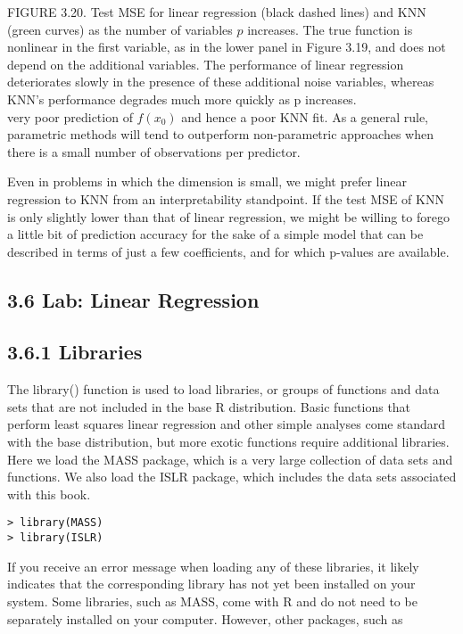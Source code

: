\documentclass[10pt]{article}
\begin{document}
FIGURE 3.20. Test MSE for linear regression (black dashed lines) and KNN (green curves) as the number of variables $p$ increases. The true function is nonlinear in the first variable, as in the lower panel in Figure 3.19, and does not depend on the additional variables. The performance of linear regression deteriorates slowly in the presence of these additional noise variables, whereas KNN's performance degrades much more quickly as p increases.\\
very poor prediction of $f\left(x_{0}\right)$ and hence a poor KNN fit. As a general rule, parametric methods will tend to outperform non-parametric approaches when there is a small number of observations per predictor.

Even in problems in which the dimension is small, we might prefer linear regression to KNN from an interpretability standpoint. If the test MSE of KNN is only slightly lower than that of linear regression, we might be willing to forego a little bit of prediction accuracy for the sake of a simple model that can be described in terms of just a few coefficients, and for which p-values are available.

\subsection*{3.6 Lab: Linear Regression}
\subsection*{3.6.1 Libraries}
The library() function is used to load libraries, or groups of functions and data sets that are not included in the base R distribution. Basic functions that perform least squares linear regression and other simple analyses come standard with the base distribution, but more exotic functions require additional libraries. Here we load the MASS package, which is a very large collection of data sets and functions. We also load the ISLR package, which includes the data sets associated with this book.

\begin{verbatim}
> library(MASS)
> library(ISLR)
\end{verbatim}

If you receive an error message when loading any of these libraries, it likely indicates that the corresponding library has not yet been installed on your system. Some libraries, such as MASS, come with R and do not need to be separately installed on your computer. However, other packages, such as
\end{document}
